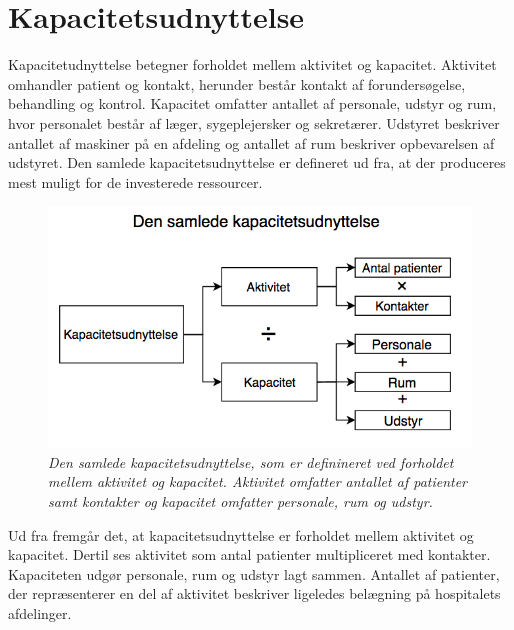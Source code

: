 \section{Kapacitetsudnyttelse} \label{kap}
Kapacitetudnyttelse betegner forholdet mellem aktivitet og kapacitet. Aktivitet omhandler patient og kontakt, herunder består kontakt af forundersøgelse, behandling og kontrol. Kapacitet omfatter antallet af personale, udstyr og rum, hvor personalet består af læger, sygeplejersker og sekretærer. Udstyret beskriver antallet af maskiner på en afdeling og antallet af rum beskriver opbevarelsen af udstyret. Den samlede kapacitetsudnyttelse er defineret ud fra, at der produceres mest muligt for de investerede ressourcer.\cite{Company2013} 

\begin{figure}[H]
	\flushleft 
	\centering
	\includegraphics[scale=.5]{figures/Kapacitetsudnyttelse.png}
	\flushleft
	\caption{\textit{Den samlede kapacitetsudnyttelse, som er definineret ved forholdet mellem aktivitet og kapacitet. Aktivitet omfatter antallet af patienter samt kontakter og kapacitet omfatter personale, rum og udstyr.}\cite{Company2013}}
	\label{kapacitet}
\end{figure}

\noindent
Ud fra  fremgår det, at kapacitetsudnyttelse er forholdet mellem aktivitet og kapacitet. Dertil ses aktivitet som antal patienter multipliceret med kontakter. Kapaciteten udgør personale, rum og udstyr lagt sammen. Antallet af patienter, der repræsenterer en del af aktivitet beskriver ligeledes belægning på hospitalets afdelinger.\cite{Company2013} 

